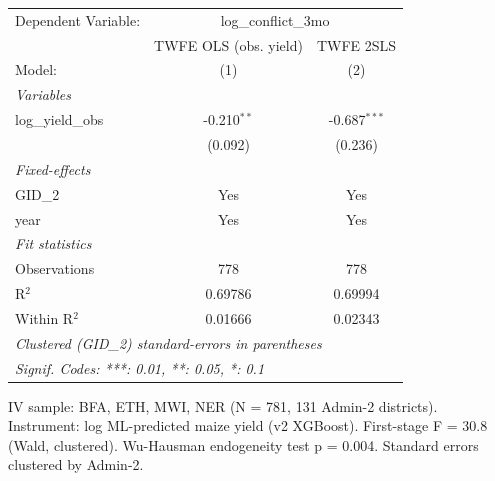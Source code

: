 
\begingroup
\centering
\begin{tabular}{lcc}
   \tabularnewline \midrule \midrule
   Dependent Variable: & \multicolumn{2}{c}{log\_conflict\_3mo}\\
                     & TWFE OLS (obs. yield) & TWFE 2SLS \\   
   Model:            & (1)                   & (2)\\  
   \midrule
   \emph{Variables}\\
   log\_yield\_obs   & -0.210$^{**}$         & -0.687$^{***}$\\   
                     & (0.092)               & (0.236)\\   
   \midrule
   \emph{Fixed-effects}\\
   GID\_2            & Yes                   & Yes\\  
   year              & Yes                   & Yes\\  
   \midrule
   \emph{Fit statistics}\\
   Observations      & 778                   & 778\\  
   R$^2$             & 0.69786               & 0.69994\\  
   Within R$^2$      & 0.01666               & 0.02343\\  
   \midrule \midrule
   \multicolumn{3}{l}{\emph{Clustered (GID\_2) standard-errors in parentheses}}\\
   \multicolumn{3}{l}{\emph{Signif. Codes: ***: 0.01, **: 0.05, *: 0.1}}\\
\end{tabular}
 
\par \raggedright 
IV sample: BFA, ETH, MWI, NER (N = 781, 131 Admin-2 districts). Instrument: log ML-predicted maize yield (v2 XGBoost). First-stage F = 30.8 (Wald, clustered). Wu-Hausman endogeneity test p = 0.004. Standard errors clustered by Admin-2.
\par\endgroup


